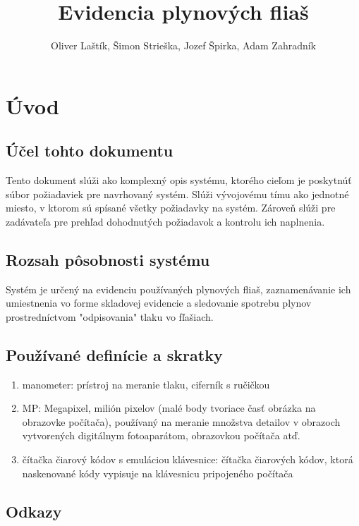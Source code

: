 \documentclass[hreffootnote]{zah}
\title{Evidencia plynových fliaš}
\author{Oliver Laštík, Šimon Strieška, Jozef Špirka, Adam Zahradník}
\begin{document}
\maketitle

\tableofcontents
\cleardoublepage

\section{Úvod}

\subsection{Účel tohto dokumentu}

Tento dokument slúži ako komplexný opis systému, ktorého cieľom je poskytnúť súbor požiadaviek pre navrhovaný systém. Slúži vývojovému tímu ako jednotné miesto, v ktorom sú spísané všetky požiadavky na systém. Zároveň slúži pre zadávateľa pre prehľad dohodnutých požiadavok a kontrolu ich naplnenia.

\subsection{Rozsah pôsobnosti systému}

Systém je určený na evidenciu používaných plynových fliaš, zaznamenávanie ich umiestnenia vo forme skladovej evidencie a sledovanie spotrebu plynov prostredníctvom "odpisovania" tlaku vo fľašiach.

\subsection{Používané definície a skratky}

\begin{enumerate}
	\item manometer: prístroj na meranie tlaku, ciferník s ručičkou
 	\item MP: Megapixel, milión pixelov (malé body tvoriace časť obrázka na obrazovke počítača), používaný na meranie množstva detailov v obrazoch vytvorených digitálnym fotoaparátom, obrazovkou počítača atď.
 	\item čítačka čiarový kódov s emuláciou klávesnice: čítačka čiarových kódov, ktorá naskenované kódy vypisuje na klávesnicu pripojeného počítača
\end{enumerate}

\subsection{Odkazy}
\end{document}
